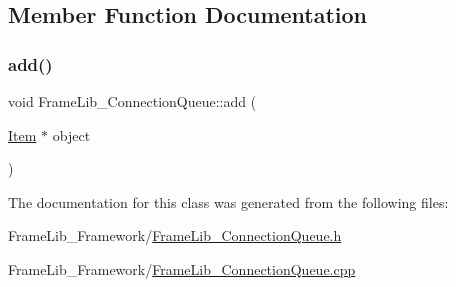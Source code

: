 \subsection{Member Function Documentation}
\mbox{\label{class_frame_lib___connection_queue_a8b41791b441ab59e16aea110ad5903d1}} 
\subsubsection{\texorpdfstring{add()}{add()}}
{\footnotesize\ttfamily void Frame\+Lib\+\_\+\+Connection\+Queue\+::add (\begin{DoxyParamCaption}\item[{\hyperlink{class_frame_lib___connection_queue_1_1_item}{Item} $\ast$}]{object }\end{DoxyParamCaption})}



The documentation for this class was generated from the following files\+:\begin{DoxyCompactItemize}
\item 
Frame\+Lib\+\_\+\+Framework/\hyperlink{_frame_lib___connection_queue_8h}{Frame\+Lib\+\_\+\+Connection\+Queue.\+h}\item 
Frame\+Lib\+\_\+\+Framework/\hyperlink{_frame_lib___connection_queue_8cpp}{Frame\+Lib\+\_\+\+Connection\+Queue.\+cpp}\end{DoxyCompactItemize}
